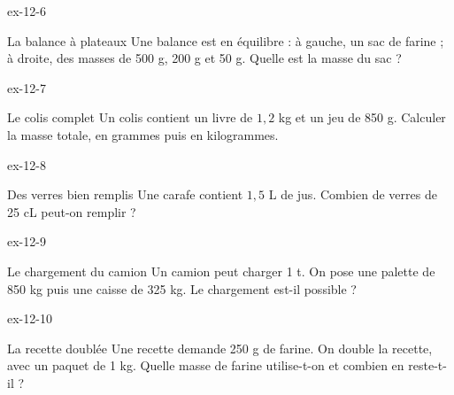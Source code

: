 \begin{blocLivre}{ex-12-6}\begin{exercice}[2]{La balance à plateaux}
Une balance est en équilibre : à gauche, un sac de farine ; à droite, des masses de 500 g, 200 g et 50 g. Quelle est la masse du sac ?
\label{fig-ex-12-6}
\end{exercice}\end{blocLivre}
\begin{blocLivre}{ex-12-7}\begin{exercice}[2]{Le colis complet}
Un colis contient un livre de $1{,}2$ kg et un jeu de 850 g. Calculer la masse totale, en grammes puis en kilogrammes.
\end{exercice}\end{blocLivre}
\begin{blocLivre}{ex-12-8}\begin{exercice}[2]{Des verres bien remplis}
Une carafe contient $1{,}5$ L de jus. Combien de verres de 25 cL peut-on remplir ?
\end{exercice}\end{blocLivre}
\begin{blocLivre}{ex-12-9}\begin{exercice}[2]{Le chargement du camion}
Un camion peut charger 1 t. On pose une palette de 850 kg puis une caisse de 325 kg. Le chargement est-il possible ?
\end{exercice}\end{blocLivre}
\begin{blocLivre}{ex-12-10}\begin{exercice}[2]{La recette doublée}
Une recette demande 250 g de farine. On double la recette, avec un paquet de 1 kg. Quelle masse de farine utilise-t-on et combien en reste-t-il ?
\end{exercice}\end{blocLivre}

